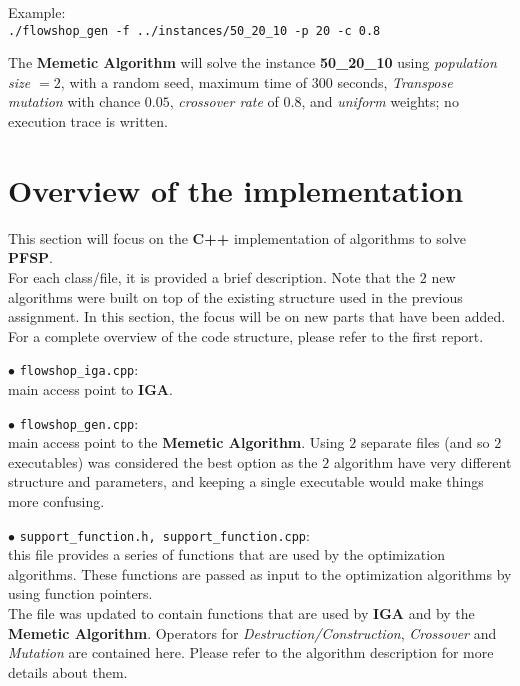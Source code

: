 \documentclass[
12pt,
a4paper,
oneside,
headinclude,
footinclude]{article}
\theoremstyle{definition} %
\begin{document}
Example:\\
\quad\texttt{./flowshop\_gen -f ../instances/50\_20\_10 -p 20 -c 0.8}

The \textbf{Memetic Algorithm} will solve the instance \textbf{50\_20\_10} using \textit{population size $= 2$}, with a random seed, maximum time of $300$ seconds, \textit{Transpose mutation} with chance $0.05$, \textit{crossover rate} of $0.8$, and \textit{uniform} weights; no execution trace is written.







\newpage
\section{Overview of the implementation}
This section will focus on the \textbf{C++} implementation of algorithms to solve \textbf{PFSP}. \\
For each class/file, it is provided a brief description. Note that the $2$ new algorithms were built on top of the existing structure used in the previous assignment.
In this section, the focus will be on new parts that have been added. For a complete overview of the code structure, please refer to the first report. 

$\bullet$ \texttt{flowshop\_iga.cpp}:\\
main access point to \textbf{IGA}. 

$\bullet$ \texttt{flowshop\_gen.cpp}:\\
main access point to the \textbf{Memetic Algorithm}. Using $2$ separate files (and so $2$ executables) was considered the best option as the $2$ algorithm have very different structure and parameters, and keeping a single executable would make things more confusing. 

$\bullet$ \texttt{support\_function.h, support\_function.cpp}: \\
this file provides a series of functions that are used by the optimization algorithms.
These functions are passed as input to the optimization algorithms by using function pointers. \\
The file was updated to contain functions that are used by \textbf{IGA} and by the \textbf{Memetic Algorithm}. Operators for \textit{Destruction/Construction}, \textit{Crossover} and \textit{Mutation} are contained here. Please refer to the algorithm description for more details about them.
\end{document}
